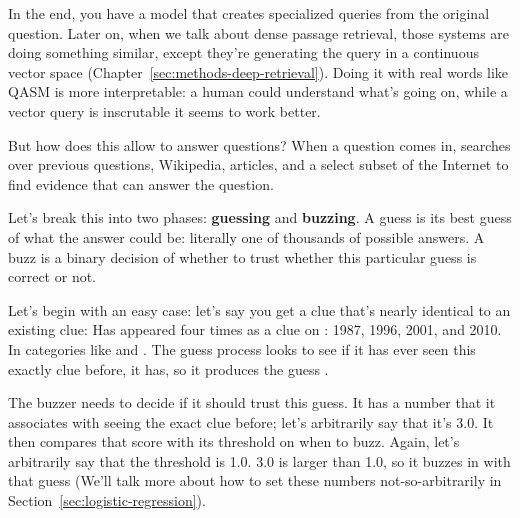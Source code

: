 
In the end, you have a model that creates specialized queries from the
original question.
%
Later on, when we talk about dense passage
retrieval, those systems are doing something similar, except they’re
generating the query in a continuous vector space (Chapter~\ref{sec:methods-deep-retrieval}).
%
Doing it with real words like QASM is more interpretable: a human could
understand what’s going on, while a vector query is inscrutable it seems to
work better.

But how does this allow \watson{} to answer questions?
%
When a question comes in, \watson{} searches over previous \jeopardy{}
questions, Wikipedia, articles, and a select subset of the Internet to find
evidence that can answer the question.

Let's break this into two phases: {\bf guessing} and {\bf buzzing}.
%
A guess is its best guess of what the answer could be: literally one of
thousands of possible answers.
%
A buzz is a binary decision of whether to trust whether this particular guess
is correct or not.

Let's begin with an easy case: let's say you get a clue that's nearly
identical to an existing clue:
Has appeared four times as a clue on \jeopardy{}: 1987, 1996, 2001, and 2010.
%
In categories like  and .
%
The guess process looks to see if it has ever seen this exactly clue before,
it has, so it produces the guess .

The buzzer needs to decide if it should trust this guess.
%
It has a number that it associates with seeing the exact clue before; let's
arbitrarily say that it's 3.0.  It then compares that score with its threshold
on when to buzz.  Again, let's arbitrarily say that the threshold is 1.0.  3.0
is larger than 1.0, so it buzzes in with that guess (We'll talk more about how to set these numbers not-so-arbitrarily in
Section~\ref{sec:logistic-regression}).

